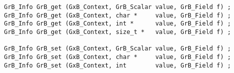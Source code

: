 \begin{mdframed}[userdefinedwidth=6in]
{\footnotesize
\begin{verbatim}
GrB_Info GrB_get (GxB_Context, GrB_Scalar value, GrB_Field f) ;
GrB_Info GrB_get (GxB_Context, char *     value, GrB_Field f) ;
GrB_Info GrB_get (GxB_Context, int *      value, GrB_Field f) ;
GrB_Info GrB_get (GxB_Context, size_t *   value, GrB_Field f) ;

GrB_Info GrB_set (GxB_Context, GrB_Scalar value, GrB_Field f) ;
GrB_Info GrB_set (GxB_Context, char *     value, GrB_Field f) ;
GrB_Info GrB_set (GxB_Context, int        value, GrB_Field f) ;
\end{verbatim}
}\end{mdframed}

